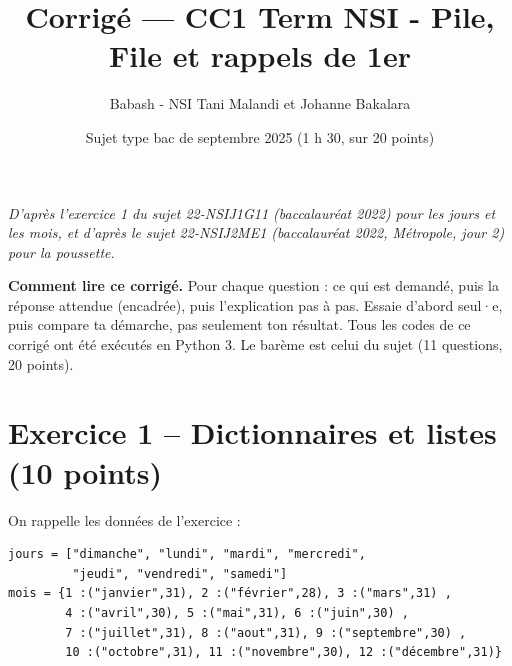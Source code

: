 \documentclass[11pt, a4paper]{exam}
\title{Corrigé — CC1 Term NSI - Pile, File et rappels de 1er}
\author{Babash - NSI Tani Malandi et Johanne Bakalara}
\date{Sujet type bac de septembre 2025 (1 h 30, sur 20 points)}
\begin{document}
\pagestyle{headandfoot}
\firstpageheader{}{}{}
\runningheadrule
{}

\maketitle
\thispagestyle{headandfoot}
\begin{center}\footnotesize\itshape D'après l'exercice 1 du sujet 22-NSIJ1G11 (baccalauréat 2022) pour les jours et les mois, et d'après le sujet 22-NSIJ2ME1 (baccalauréat 2022, Métropole, jour 2) pour la poussette.\end{center}

\begin{tcolorbox}[colback=white, colframe=black, boxrule=0.5pt, arc=1mm, left=2mm, right=2mm]
\small\textbf{Comment lire ce corrigé.} Pour chaque question : ce qui est demandé, puis la réponse attendue (encadrée), puis l'explication pas à pas. Essaie d'abord seul·e, puis compare ta démarche, pas seulement ton résultat. Tous les codes de ce corrigé ont été exécutés en Python 3.
Le barème est celui du sujet (11 questions, 20 points).
\end{tcolorbox}

\section*{Exercice 1 -- Dictionnaires et listes (10 points)}

On rappelle les données de l'exercice :
\begin{lstlisting}
jours = ["dimanche", "lundi", "mardi", "mercredi",
         "jeudi", "vendredi", "samedi"]
mois = {1 :("janvier",31), 2 :("février",28), 3 :("mars",31) ,
        4 :("avril",30), 5 :("mai",31), 6 :("juin",30) ,
        7 :("juillet",31), 8 :("aout",31), 9 :("septembre",30) ,
        10 :("octobre",31), 11 :("novembre",30), 12 :("décembre",31)}
\end{lstlisting}
\end{document}
